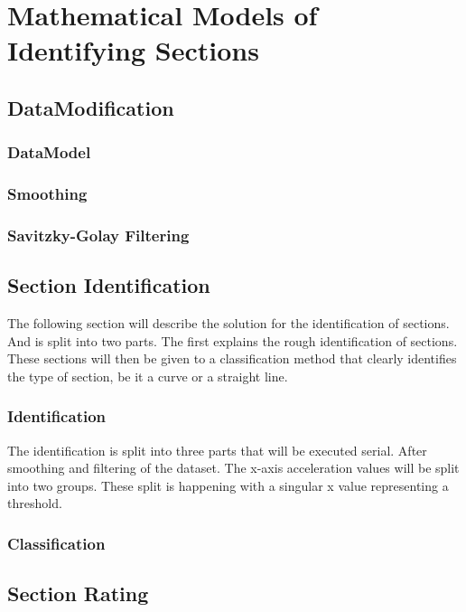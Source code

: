 \chapter{Mathematical Models of Identifying Sections}

\section{DataModification}
\subsection{DataModel }

\subsection{Smoothing}

\subsection{Savitzky-Golay Filtering}

\section{Section Identification}
The following section will describe the solution for the identification of sections. And is split into two parts. The first explains the rough identification of sections. These sections will then be given to a classification method that clearly identifies the type of section, be it a curve or a straight line. 

\subsection{Identification}
The identification is split into three parts that will be executed serial. After smoothing and filtering of the dataset. The x-axis acceleration values will be split into two groups. These split is happening with a singular x value representing a threshold.  

\subsection{Classification}

\section{Section Rating}